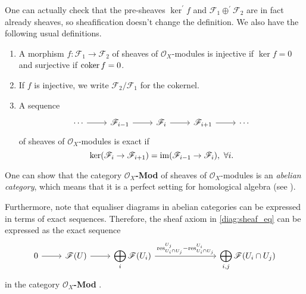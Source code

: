 One can actually check that the pre-sheaves $\ker^{\prime} f$ and
$\mathscr{F}_{1}\oplus^{\prime}\mathscr{F}_{2}$ are in fact already sheaves,
so sheafification doesn't change the definition. We also have the following
usual definitions.
\begin{defin}\hfill

  \begin{enumerate}
    \item A morphism $f:\mathscr{F}_{1}\to\mathscr{F}_{2}$ of sheaves of
          $\mathscr{O}_{X}$-modules is injective if $\ker f = 0$ and
          surjective if $\operatorname{coker} f = 0$.
    \item If $f$ is injective, we write $\mathscr{F}_{2}/\mathscr{F}_{1}$
          for the cokernel.
    \item A sequence
          \[\begin{tikzcd}
              \cdots\rar & \mathscr{F}_{i-1}\rar & \mathscr{F}_{i}\rar
              & \mathscr{F}_{i+1}\rar & \cdots
            \end{tikzcd}\]
          of sheaves of $\mathscr{O}_{X}$-modules is exact if
          \[
          \ker(\mathscr{F}_{i}\to\mathscr{F}_{i+1})=\operatorname{im}(\mathscr{F}_{i-1}
          \to\mathscr{F}_{i}),\ \forall i.
          \]
  \end{enumerate}

\end{defin}
\begin{cat}
  One can show that the category $\mathscr{O}_{X}$\textbf{-Mod} of sheaves
  of $\mathscr{O}_{X}$-modules is an \emph{abelian category}, which means
  that it is a perfect setting for homological algebra (see \cite{vakil}).

  Furthermore, note that equaliser diagrams in abelian categories can be
  expressed in terms of exact sequences. Therefore, the sheaf axiom in
  \eqref{diag:sheaf_eq} can be expressed as the exact sequence
  \begin{equation}\label{diag:sheaf_ex}\begin{tikzcd}
      0\rar & \mathscr{F}(U)\rar
      & \displaystyle\bigoplus_{i}\mathscr{F}(U_{i})
      \rar{\text{res}_{U_{i}\cap U_{j}}^{U_{j}}-\text{res}_{U_{i}\cap U_{j}}^{ U_{i}}}
      &[5em] \displaystyle\bigoplus_{i,j}\mathscr{F}(U_{i}\cap U_{j})
    \end{tikzcd}\end{equation}
  in the category $\mathscr{O}_{X}$\textbf{-Mod} \cite{maclane}.
\end{cat}

